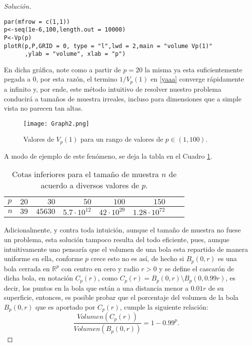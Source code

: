 \documentclass[10.5pt,notitlepage]{article}
\newenvironment{solucion}
  {\begin{proof}[Solución]}
  {\end{proof}}
\newcommand{\RR}{\mathbb{R}}
\theoremstyle{plain}
\begin{document}
\begin{solucion}
\begin{verbatim}
par(mfrow = c(1,1))
p<-seq(1e-6,100,length.out = 10000)
P<-Vp(p)
plotR(p,P,GRID = 0, type = "l",lwd = 2,main = "volume Vp(1)"
      ,ylab = "volume", xlab = "p")
\end{verbatim}
En dicha gráfica, note como a partir de \(p = 20\) la misma ya esta suficientemente pegada a \(0\), por esta razón, el termino \(1/V_{p}(1)\) en \eqref{yaaa} converge rápidamente a infinito y, por ende, este método intuitivo de resolver nuestro problema conducirá a tamaños de muestra irreales, incluso para dimensiones que a simple vista no parecen tan altas. 
\begin{figure}[htb]
    \centering
    \texttt{[image: Graph2.png]}
    \caption{Valores de \(V_{p}(1)\) para un rango de valores de \(p \in(1,100)\).}
    \label{fig:6}
\end{figure}
A modo de ejemplo de este fenómeno, se deja la tabla en el Cuadro \ref{tab:1}.
\begin{table}[H]
        \centering
        \begin{tabular}{@{}l@{\hskip 0.3in}r@{\hskip 0.3in}r@{\hskip 0.3in}r@{\hskip 0.3in}r@{\hskip 0.3in}r@{\hskip 0.3in}r@{\hskip 0.3in}r@{}}
            \toprule
              \(p\) &\(20\) & \(30\) &  \(50\)& \(100\)&\(150\)\\ 
            \midrule
              \(n\) &  \(39\)&  \(45630\) &\(5.7\cdot 10^{12}\)& \(42\cdot 10^{29}\) & \(1.28\cdot 10^{72}\) \\ 
            \bottomrule
        \end{tabular}
        \caption{Cotas inferiores para el tamaño de muestra \(n\) de acuerdo a diversos valores de \(p\).}
        \label{tab:1}
\end{table}
Adicionalmente, y contra toda intuición, aunque el tamaño de muestra no fuese un problema, esta solución tampoco resulta del todo eficiente, pues, aunque intuitivamente uno pensaría que el volumen de una bola esta repartido de manera uniforme en ella, conforme \(p\) crece esto no es así, de hecho si \(B_{p}(0,r)\) es una bola cerrada en \(\RR^p\) con centro en cero y radio \(r >0\) y se define el cascarón de dicha bola, en notación \(C_{p}(r)\), como \(C_{p}(r) = B_{p}(0,r)\setminus B_{p}(0,0.99r)\), es decir, los puntos en la bola que están a una distancia menor a \(0.01r\) de su superficie, entonces, es posible probar que el porcentaje del volumen de la bola \(B_{p}(0,r)\) que es aportado por \(C_{p}(r)\), cumple la siguiente relación:
\begin{equation*}
    \frac{Volumen(C_{p}(r))}{Volumen(B_{p}(0,r))} = 1 - 0.99^p.

\end{equation*}
\end{solucion}
\end{document}
